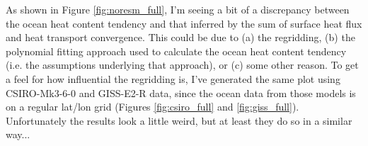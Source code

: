 As shown in Figure \ref{fig:noresm_full}, I'm seeing a bit of a discrepancy between the ocean heat content tendency and that inferred by the sum of surface heat flux and heat transport convergence. This could be due to (a) the regridding, (b) the polynomial fitting approach used to calculate the ocean heat content tendency (i.e. the assumptions underlying that approach), or (c) some other reason. To get a feel for how influential the regridding is, I've generated the same plot using CSIRO-Mk3-6-0 and GISS-E2-R data, since the ocean data from those models is on a regular lat/lon grid (Figures \ref{fig:csiro_full} and \ref{fig:giss_full}). Unfortunately the results look a little weird, but at least they do so in a similar way...